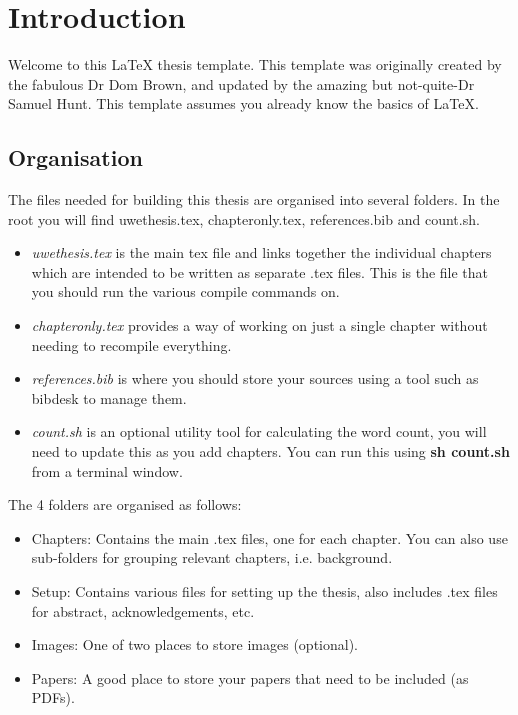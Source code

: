 \chapter{Introduction}\label{chap:intro}


Welcome to this \LaTeX{} thesis template. This template was originally created by the fabulous Dr Dom Brown, and updated by the amazing but not-quite-Dr Samuel Hunt. This template assumes you already know the basics of \LaTeX{}.



\section{Organisation}

The files needed for building this thesis are organised into several folders. In the root you will find uwethesis.tex, chapteronly.tex, references.bib and count.sh. 

\begin{itemize}
\item \textit{uwethesis.tex} is the main tex file and links together the individual chapters which are intended to be written as separate .tex files. This is the file that you should run the various compile commands on.
\item \textit{chapteronly.tex} provides a way of working on just a single chapter without needing to recompile everything.
\item \textit{references.bib} is where you should store your sources using a tool such as bibdesk to manage them. 
\item \textit{count.sh} is an optional utility tool for calculating the word count, you will need to update this as you add chapters. You can run this using \textbf{sh count.sh} from a terminal window. 
\end{itemize}



The 4 folders are organised as follows:


\begin{itemize}
\item Chapters: Contains the main .tex files, one for each chapter. You can also use sub-folders for grouping relevant chapters, i.e. background.
\item Setup: Contains various files for setting up the thesis, also includes .tex files for abstract, acknowledgements, etc.
\item Images: One of two places to store images (optional).
\item Papers: A good place to store your papers that need to be included (as PDFs).
\end{itemize}



